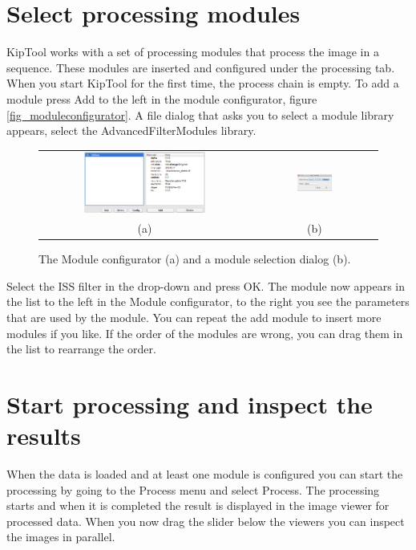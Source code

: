 \documentclass[a4paper]{scrreprt}
\begin{document}
\section{Select processing modules}
KipTool works with a set of processing modules that process the image in a sequence. These modules are inserted and configured under the processing tab. When you start KipTool for the first time, the process chain is empty. To add a module press Add to the left in the module configurator, figure \ref{fig_moduleconfigurator}. A file dialog that asks you to select a module library appears, select the AdvancedFilterModules library. 
\begin{figure}[ht!]
\centering
\begin{tabular}{cc}
\includegraphics[width=0.6\textwidth]{figures/ModuleConfigurator.png} &
\includegraphics[width=0.3\textwidth]{figures/ModuleSelectionDlg.png} \\
(a) & (b)
\end{tabular}
\caption{The Module configurator (a) and a module selection dialog (b).}
\label{ref_moduleconfigurator}
\end{figure}
Select the ISS filter in the drop-down and press OK. The module now appears in the list to the left in the Module configurator, to the right you see the parameters that are used by the module. You can repeat the add module to insert more modules if you like. If the order of the modules are wrong, you can drag them in the list to rearrange the order.

\section{Start processing and inspect the results}
When the data is loaded and at least one module is configured you can start the processing by going to the Process menu and select Process. The processing starts and when it is completed the result is displayed in the image viewer for processed data. When you now drag the slider below the viewers you can inspect the images in parallel.  
\end{document}
